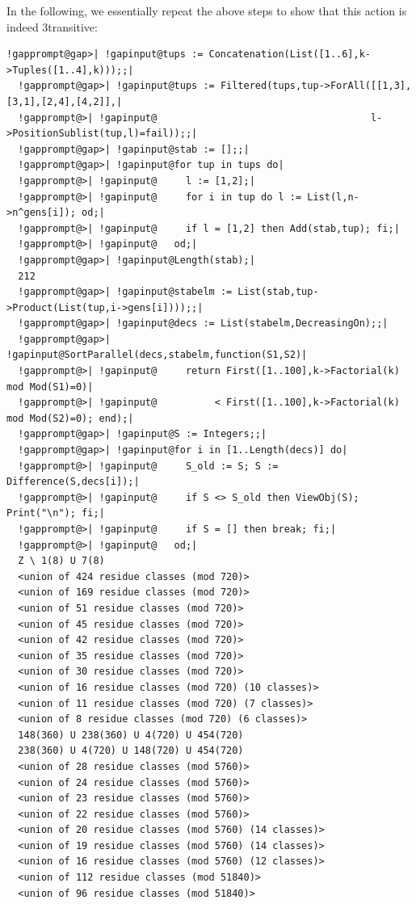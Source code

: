 \documentclass[a4paper,11pt]{report}
\begin{document}
{{ In the following, we essentially repeat the above steps to show that this
action is indeed 3\texttt{}transitive: 
\begin{Verbatim}[commandchars=!@|,fontsize=\small,frame=single,label=Example]
  !gapprompt@gap>| !gapinput@tups := Concatenation(List([1..6],k->Tuples([1..4],k)));;|
  !gapprompt@gap>| !gapinput@tups := Filtered(tups,tup->ForAll([[1,3],[3,1],[2,4],[4,2]],|
  !gapprompt@>| !gapinput@                                     l->PositionSublist(tup,l)=fail));;|
  !gapprompt@gap>| !gapinput@stab := [];;|
  !gapprompt@gap>| !gapinput@for tup in tups do|
  !gapprompt@>| !gapinput@     l := [1,2];|
  !gapprompt@>| !gapinput@     for i in tup do l := List(l,n->n^gens[i]); od;|
  !gapprompt@>| !gapinput@     if l = [1,2] then Add(stab,tup); fi;|
  !gapprompt@>| !gapinput@   od;|
  !gapprompt@gap>| !gapinput@Length(stab);|
  212
  !gapprompt@gap>| !gapinput@stabelm := List(stab,tup->Product(List(tup,i->gens[i])));;|
  !gapprompt@gap>| !gapinput@decs := List(stabelm,DecreasingOn);;|
  !gapprompt@gap>| !gapinput@SortParallel(decs,stabelm,function(S1,S2)|
  !gapprompt@>| !gapinput@     return First([1..100],k->Factorial(k) mod Mod(S1)=0)|
  !gapprompt@>| !gapinput@          < First([1..100],k->Factorial(k) mod Mod(S2)=0); end);|
  !gapprompt@gap>| !gapinput@S := Integers;;|
  !gapprompt@gap>| !gapinput@for i in [1..Length(decs)] do|
  !gapprompt@>| !gapinput@     S_old := S; S := Difference(S,decs[i]);|
  !gapprompt@>| !gapinput@     if S <> S_old then ViewObj(S); Print("\n"); fi;|
  !gapprompt@>| !gapinput@     if S = [] then break; fi;|
  !gapprompt@>| !gapinput@   od;|
  Z \ 1(8) U 7(8)
  <union of 424 residue classes (mod 720)>
  <union of 169 residue classes (mod 720)>
  <union of 51 residue classes (mod 720)>
  <union of 45 residue classes (mod 720)>
  <union of 42 residue classes (mod 720)>
  <union of 35 residue classes (mod 720)>
  <union of 30 residue classes (mod 720)>
  <union of 16 residue classes (mod 720) (10 classes)>
  <union of 11 residue classes (mod 720) (7 classes)>
  <union of 8 residue classes (mod 720) (6 classes)>
  148(360) U 238(360) U 4(720) U 454(720)
  238(360) U 4(720) U 148(720) U 454(720)
  <union of 28 residue classes (mod 5760)>
  <union of 24 residue classes (mod 5760)>
  <union of 23 residue classes (mod 5760)>
  <union of 22 residue classes (mod 5760)>
  <union of 20 residue classes (mod 5760) (14 classes)>
  <union of 19 residue classes (mod 5760) (14 classes)>
  <union of 16 residue classes (mod 5760) (12 classes)>
  <union of 112 residue classes (mod 51840)>
  <union of 96 residue classes (mod 51840)>

\end{Verbatim}}}
\end{document}
